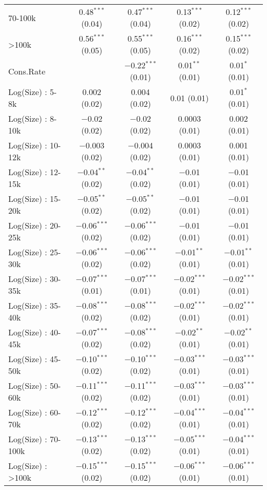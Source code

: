 \begin{table}[!htbp]
\begin{tabular}{@{\extracolsep{5pt}}lcccc}
  70-100k & 0.48$^{***}$ (0.04) & 0.47$^{***}$ (0.04) & 0.13$^{***}$ (0.02) & 0.12$^{***}$ (0.02) \\ 
  >100k & 0.56$^{***}$ (0.05) & 0.55$^{***}$ (0.05) & 0.16$^{***}$ (0.02) & 0.15$^{***}$ (0.02) \\ 
  Cons.Rate &  & $-$0.22$^{***}$ (0.01) & 0.01$^{**}$ (0.01) & 0.01$^{*}$ (0.01) \\ 
  Log(Size) : 5-8k & 0.002 (0.02) & 0.004 (0.02) & 0.01 (0.01) & 0.01$^{*}$ (0.01) \\ 
  Log(Size) : 8-10k & $-$0.02 (0.02) & $-$0.02 (0.02) & 0.0003 (0.01) & 0.002 (0.01) \\ 
  Log(Size) : 10-12k & $-$0.003 (0.02) & $-$0.004 (0.02) & 0.0003 (0.01) & 0.001 (0.01) \\ 
  Log(Size) : 12-15k & $-$0.04$^{**}$ (0.02) & $-$0.04$^{**}$ (0.02) & $-$0.01 (0.01) & $-$0.01 (0.01) \\ 
  Log(Size) : 15-20k & $-$0.05$^{**}$ (0.02) & $-$0.05$^{**}$ (0.02) & $-$0.01 (0.01) & $-$0.01 (0.01) \\ 
  Log(Size) : 20-25k & $-$0.06$^{***}$ (0.02) & $-$0.06$^{***}$ (0.02) & $-$0.01 (0.01) & $-$0.01 (0.01) \\ 
  Log(Size) : 25-30k & $-$0.06$^{***}$ (0.02) & $-$0.06$^{***}$ (0.02) & $-$0.01$^{**}$ (0.01) & $-$0.01$^{**}$ (0.01) \\ 
  Log(Size) : 30-35k & $-$0.07$^{***}$ (0.01) & $-$0.07$^{***}$ (0.01) & $-$0.02$^{***}$ (0.01) & $-$0.02$^{***}$ (0.01) \\ 
  Log(Size) : 35-40k & $-$0.08$^{***}$ (0.02) & $-$0.08$^{***}$ (0.02) & $-$0.02$^{***}$ (0.01) & $-$0.02$^{***}$ (0.01) \\ 
  Log(Size) : 40-45k & $-$0.07$^{***}$ (0.02) & $-$0.08$^{***}$ (0.02) & $-$0.02$^{**}$ (0.01) & $-$0.02$^{**}$ (0.01) \\ 
  Log(Size) : 45-50k & $-$0.10$^{***}$ (0.02) & $-$0.10$^{***}$ (0.02) & $-$0.03$^{***}$ (0.01) & $-$0.03$^{***}$ (0.01) \\ 
  Log(Size) : 50-60k & $-$0.11$^{***}$ (0.02) & $-$0.11$^{***}$ (0.02) & $-$0.03$^{***}$ (0.01) & $-$0.03$^{***}$ (0.01) \\ 
  Log(Size) : 60-70k & $-$0.12$^{***}$ (0.02) & $-$0.12$^{***}$ (0.02) & $-$0.04$^{***}$ (0.01) & $-$0.04$^{***}$ (0.01) \\ 
  Log(Size) : 70-100k & $-$0.13$^{***}$ (0.02) & $-$0.13$^{***}$ (0.02) & $-$0.05$^{***}$ (0.01) & $-$0.04$^{***}$ (0.01) \\ 
  Log(Size) : >100k & $-$0.15$^{***}$ (0.02) & $-$0.15$^{***}$ (0.02) & $-$0.06$^{***}$ (0.01) & $-$0.06$^{***}$ (0.01) \\ 

\end{tabular}
\end{table}
